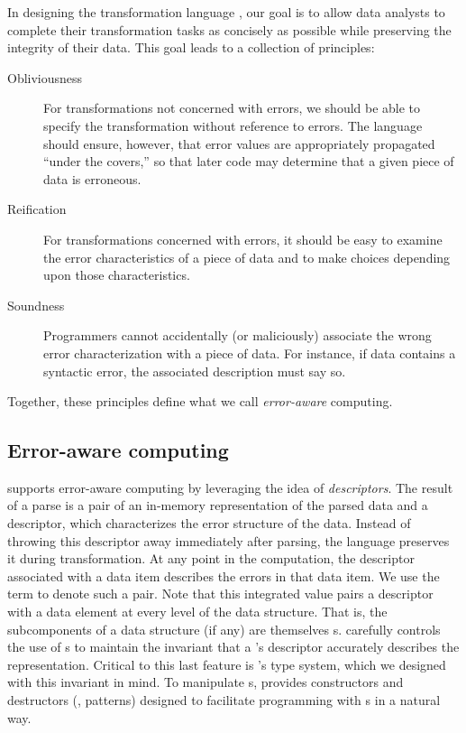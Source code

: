 In designing the transformation language \datatype{}, our goal is to allow data analysts to complete their transformation tasks as concisely as possible while preserving the integrity of their data.  This goal leads to a collection of principles:
%
\begin{description}
\item[Obliviousness] For transformations not concerned with errors, we should be able to specify the transformation without reference to errors.  The language should ensure, however, that error values are appropriately propagated ``under the covers,'' so that later code may determine that a given piece of data is erroneous.
\item[Reification] For transformations concerned with errors, it should be easy to examine the error characteristics of a piece of data and to make choices depending upon those characteristics.
\item[Soundness] Programmers cannot accidentally (or
maliciously) associate the wrong error characterization with a piece of
data.  For instance, if data contains a syntactic error, the associated
description must say so.
\end{description}
%
Together, these principles define what we call \textit{error-aware} computing.

\subsection{Error-aware computing}
\datatype{} supports error-aware computing by leveraging the idea of  \textit{descriptors}.   The result of a parse is a pair of an in-memory representation of the parsed data and a descriptor, which characterizes the error structure of the data.  Instead of throwing this descriptor away immediately after parsing, the language preserves it during transformation.  At any point in the computation, the descriptor associated with a data item describes the errors in that data item.  We use the term \textit{\pvalue{}} to denote such a pair.  Note that this integrated value pairs a descriptor with a data element at every level of the data structure. That is, the subcomponents of a data structure (if any) are themselves \pvalue{}s.
\datatype{} carefully controls the use of \pvalue{}s to maintain the invariant that a \pvalue{}'s descriptor accurately describes the representation.
Critical to this last feature is \datatype{}'s type system, which we 
designed with this invariant in mind.
To manipulate \pvalue{}s, \datatype{} provides constructors and destructors (\ie{}, patterns) designed to facilitate programming with \pvalue{}s in a natural way.


